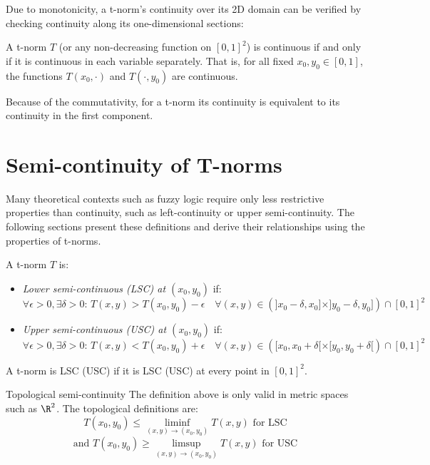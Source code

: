 Due to monotonicity, a t-norm's continuity over its 2D domain can be verified by checking continuity along its one-dimensional sections:
\begin{proposition}
A t-norm $T$ (or any non-decreasing function on $[0,1]^2$) is continuous if and only if it is continuous in each variable separately. That is, for all fixed $x_0, y_0 \in [0,1]$, the functions $T(x_0, \cdot)$ and $T(\cdot, y_0)$ are continuous.
\end{proposition}

\begin{remark}
Because of the commutativity, for a t-norm
its continuity is equivalent to its continuity in the first component.\cite[p.~16]{Klement2000}
\end{remark}

\section{Semi-continuity of T-norms}
\label{app:semicont-tnorms}

Many theoretical contexts such as fuzzy logic require only less restrictive properties than continuity, such as left-continuity or upper semi-continuity. The following sections present these definitions and derive their relationships using the properties of t-norms.


\begin{definition}
    A t-norm $T$ is:
    \begin{itemize}
        \item \emph{Lower semi-continuous (LSC) at $(x_0,y_0)$} if:
        \[
        \forall \epsilon > 0, \exists \delta > 0 :\, T(x,y) > T(x_0,y_0) - \epsilon \quad \forall (x,y) \in \left(]x_0 - \delta, x_0] \times ]y_0 - \delta, y_0]\right) \cap [0,1]^2
        \]
        \item \emph{Upper semi-continuous (USC) at $(x_0,y_0)$} if:
        \[
        \forall \epsilon > 0, \exists \delta > 0 :\, T(x,y) < T(x_0,y_0) + \epsilon \quad \forall (x,y) \in \left([x_0, x_0 + \delta[ \times [y_0, y_0 + \delta[\right) \cap [0,1]^2
        \]
    \end{itemize}
    A t-norm is LSC (USC) if it is LSC (USC) at every point in $[0,1]^2$.
    \end{definition}
    \begin{notation}{Topological semi-continuity}
        The definition above is only valid in metric spaces such as $\R^2$. The topological definitions are: $$T(x_0, y_0) \le \liminf_{(x,y) \to (x_0,y_0)} T(x,y) \text{ for LSC}$$   $$\text{and } T(x_0, y_0) \ge \limsup_{(x,y) \to (x_0,y_0)} T(x,y)\text{ for USC}$$
    \end{notation}
  
